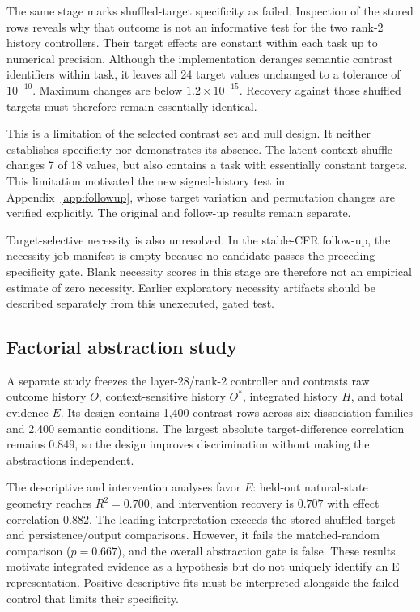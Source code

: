 \documentclass{article}
\begin{document}
The same stage marks shuffled-target specificity as failed. Inspection of the stored rows reveals why that outcome is not an informative test for the two rank-2 history controllers. Their target effects are constant within each task up to numerical precision. Although the implementation deranges semantic contrast identifiers within task, it leaves all 24 target values unchanged to a tolerance of $10^{-10}$. Maximum changes are below $1.2\times10^{-15}$. Recovery against those shuffled targets must therefore remain essentially identical.

This is a limitation of the selected contrast set and null design. It neither establishes specificity nor demonstrates its absence. The latent-context shuffle changes 7 of 18 values, but also contains a task with essentially constant targets. This limitation motivated the new signed-history test in Appendix~\ref{app:followup}, whose target variation and permutation changes are verified explicitly. The original and follow-up results remain separate.

Target-selective necessity is also unresolved. In the stable-CFR follow-up, the necessity-job manifest is empty because no candidate passes the preceding specificity gate. Blank necessity scores in this stage are therefore not an empirical estimate of zero necessity. Earlier exploratory necessity artifacts should be described separately from this unexecuted, gated test.

\subsection{Factorial abstraction study}
A separate study freezes the layer-28/rank-2 controller and contrasts raw outcome history $O$, context-sensitive history $O^*$, integrated history $H$, and total evidence $E$. Its design contains 1,400 contrast rows across six dissociation families and 2,400 semantic conditions. The largest absolute target-difference correlation remains $0.849$, so the design improves discrimination without making the abstractions independent.

The descriptive and intervention analyses favor $E$: held-out natural-state geometry reaches $R^2=0.700$, and intervention recovery is $0.707$ with effect correlation $0.882$. The leading interpretation exceeds the stored shuffled-target and persistence/output comparisons. However, it fails the matched-random comparison ($p=0.667$), and the overall abstraction gate is false. These results motivate integrated evidence as a hypothesis but do not uniquely identify an E representation. Positive descriptive fits must be interpreted alongside the failed control that limits their specificity.
\end{document}
